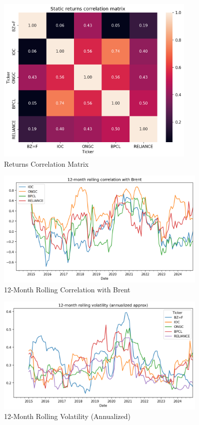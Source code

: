 \documentclass[11pt]{article}
\begin{document}
\begin{figure}[htbp]
\centering
\includegraphics[width=0.85\textwidth]{corr_matrix.png}
\caption{Returns Correlation Matrix}
\label{fig:corr}
\end{figure}

\begin{figure}[htbp]
\centering
\includegraphics[width=0.9\textwidth]{rolling_corr_with_brent.png}
\caption{12-Month Rolling Correlation with Brent}
\label{fig:rolling_corr}
\end{figure}

\begin{figure}[htbp]
\centering
\includegraphics[width=0.9\textwidth]{rolling_volatility_12m.png}
\caption{12-Month Rolling Volatility (Annualized)}
\label{fig:rolling_vol}
\end{figure}
\end{document}
